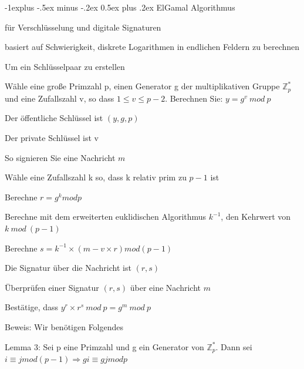 \documentclass[a4paper]{article}
\makeatletter
\renewcommand{\subsection}{\@startsection{subsection}{2}{0mm}%
 {-1explus -.5ex minus -.2ex}%
 {0.5ex plus .2ex}%
 {\normalfont\normalsize\bfseries}}
\makeatother
\begin{document}
\begin{multicols}{3}
      \subsection{ElGamal Algorithmus}
      \begin{itemize*}
            \item für Verschlüsselung und digitale Signaturen
            \item basiert auf Schwierigkeit, diskrete Logarithmen in endlichen Feldern zu berechnen
            \item Um ein Schlüsselpaar zu erstellen
            \begin{itemize*}
                  \item Wähle eine große Primzahl p, einen Generator g der multiplikativen Gruppe $\mathbb{Z}^*_p$ und eine Zufallszahl v, so dass $1\leq v\leq p - 2$. Berechnen Sie: $y=g^v\ mod\ p$
                  \item Der öffentliche Schlüssel ist $( y, g, p )$
                  \item Der private Schlüssel ist v
            \end{itemize*}
            \item So signieren Sie eine Nachricht $m$
            \begin{itemize*}
                  \item Wähle eine Zufallszahl k so, dass k relativ prim zu $p-1$ ist
                  \item Berechne $r=g^k mod p$
                  \item Berechne mit dem erweiterten euklidischen Algorithmus $k^{-1}$, den Kehrwert von $k\ mod\ (p-1)$
                  \item Berechne $s=k^{-1} \times(m-v \times r)mod(p-1)$
                  \item Die Signatur über die Nachricht ist $(r,s)$
            \end{itemize*}
            \item Überprüfen einer Signatur $(r,s)$ über eine Nachricht $m$
            \begin{itemize*}
                  \item Bestätige, dass $y^r\times r^s\ mod\ p = g^m\ mod\ p$
                  \item Beweis: Wir benötigen Folgendes
                  \begin{itemize*}
                        \item Lemma 3: Sei p eine Primzahl und g ein Generator von $\mathbb{Z}^*_p$. Dann sei $i \equiv j mod ( p -1) \Rightarrow g i \equiv g j mod p$

\end{itemize*}
\end{itemize*}
\end{itemize*}
\end{multicols}
\end{document}
